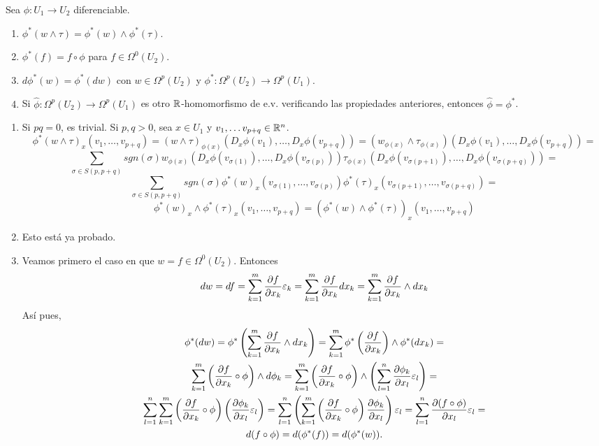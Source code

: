 \documentclass[CV.tex]{subfiles}
\begin{document}
\begin{teorema}
Sea $\phi:U_1\to U_2$ diferenciable.
\begin{enumerate}
\item $\phi^*(w\land\tau)=\phi^*(w)\land\phi^*(\tau)$.
\item $\phi^*(f)=f\circ\phi$ para $f\in\Omega^0(U_2)$.
\item $d\phi^*(w)=\phi^*(dw)$ con $w\in\Omega^p(U_2)$ y $\phi^*:\Omega^p(U_2)\to\Omega^p(U_1)$.
\item Si $\hat{\phi}:\Omega^p(U_2)\to\Omega^p(U_1)$ es otro $\mathbb{R}$-homomorfismo de e.v. verificando las propiedades anteriores, entonces $\hat{\phi}=\phi^*$.
\end{enumerate}
\end{teorema}
\begin{dem}
\begin{enumerate}
\item Si $pq=0$, es trivial. Si $p,q>0$, sea $x\in U_1$ y $v_1,\dots v_{p+q}\in\mathbb{R}^n$.
\[
\phi^*(w\land\tau)_x(v_1,\dots, v_{p+q})=(w\land\tau)_{\phi(x)}(D_x\phi(v_1),\dots, D_x\phi(v_{p+q}))=(w_{\phi(x)}\land\tau_{\phi(x)})(D_x\phi(v_1),\dots, D_x\phi(v_{p+q}))=
\]
\[
\sum_{\sigma\in S(p,p+q)}sgn(\sigma)w_{\phi(x)}(D_x\phi(v_{\sigma(1)}),\dots, D_x\phi(v_{\sigma(p)}))\tau_{\phi(x)}(D_x\phi(v_{\sigma(p+1)}),\dots, D_x\phi(v_{\sigma(p+q)}))=
\]
\[
\sum_{\sigma\in S(p,p+q)}sgn(\sigma)\phi^*(w)_x(v_{\sigma(1)},\dots, v_{\sigma(p)})\phi^*(\tau)_x(v_{\sigma(p+1)},\dots, v_{\sigma(p+q)})=
\]
\[
\phi^*(w)_x\land \phi^*(\tau)_x(v_1,\dots, v_{p+q})=(\phi^*(w)\land \phi^*(\tau))_x(v_1,\dots, v_{p+q})
\]

\item Esto está ya probado.

\item Veamos primero el caso en que $w=f\in\Omega^0(U_2)$. Entonces 
\[
dw=df=\sum_{k=1}^m\frac{\partial f}{\partial x_k}\varepsilon_k=\sum_{k=1}^m\frac{\partial f}{\partial x_k}dx_k=\sum_{k=1}^m\frac{\partial f}{\partial x_k}\land dx_k
\]
Así pues,
\begin{gather*}
\phi^*(dw)=\phi^*\left(\sum_{k=1}^m\frac{\partial f}{\partial x_k}\land dx_k\right)=\sum_{k=1}^m\phi^*\left(\frac{\partial f}{\partial x_k}\right)\land\phi^*(dx_k)=\\
\sum_{k=1}^m\left(\frac{\partial f}{\partial x_k}\circ\phi \right)\land d\phi_k=\sum_{k=1}^m\left(\frac{\partial f}{\partial x_k}\circ\phi\right)\land \left(\sum_{l=1}^n\frac{\partial \phi_k}{\partial x_l}\varepsilon_l\right)=\\
\sum_{l=1}^n\sum_{k=1}^m\left(\frac{\partial f}{\partial x_k}\circ\phi\right)\left(\frac{\partial \phi_k}{\partial x_l}\varepsilon_l\right)=\sum_{l=1}^n\left(\sum_{k=1}^m\left(\frac{\partial f}{\partial x_k}\circ\phi\right)\frac{\partial \phi_k}{\partial x_l}\right)\varepsilon_l=\sum_{l=1}^n\frac{\partial (f\circ\phi)}{\partial x_l}\varepsilon_l=\\
d(f\circ\phi)=d(\phi^*(f))=d(\phi^*(w)).
\end{gather*}


\end{enumerate}
\end{dem}
\end{document}
